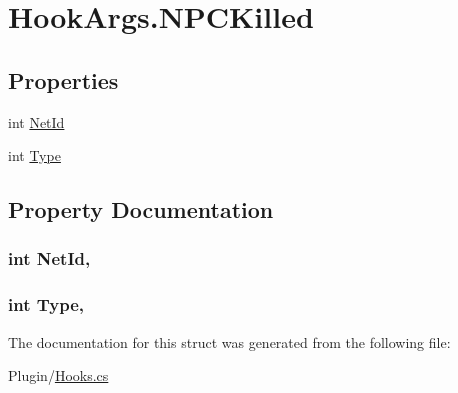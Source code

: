 \hypertarget{structOTA_1_1Plugin_1_1HookArgs_1_1NPCKilled}{}\section{Hook\+Args.\+N\+P\+C\+Killed}
\label{structOTA_1_1Plugin_1_1HookArgs_1_1NPCKilled}
\subsection*{Properties}
\begin{DoxyCompactItemize}
\item 
int \hyperlink{structOTA_1_1Plugin_1_1HookArgs_1_1NPCKilled_aede63d7c2e2a69e81c9019dd614e55fa}{Net\+Id}
\item 
int \hyperlink{structOTA_1_1Plugin_1_1HookArgs_1_1NPCKilled_ae011432eaca3858364b05a111f4011d3}{Type}
\end{DoxyCompactItemize}


\subsection{Property Documentation}
\hypertarget{structOTA_1_1Plugin_1_1HookArgs_1_1NPCKilled_aede63d7c2e2a69e81c9019dd614e55fa}{}
\subsubsection[{Net\+Id}]{\setlength{\rightskip}{0pt plus 5cm}int Net\+Id\hspace{0.3cm}{\ttfamily [get]}, {\ttfamily [set]}}\label{structOTA_1_1Plugin_1_1HookArgs_1_1NPCKilled_aede63d7c2e2a69e81c9019dd614e55fa}
\hypertarget{structOTA_1_1Plugin_1_1HookArgs_1_1NPCKilled_ae011432eaca3858364b05a111f4011d3}{}
\subsubsection[{Type}]{\setlength{\rightskip}{0pt plus 5cm}int Type\hspace{0.3cm}{\ttfamily [get]}, {\ttfamily [set]}}\label{structOTA_1_1Plugin_1_1HookArgs_1_1NPCKilled_ae011432eaca3858364b05a111f4011d3}


The documentation for this struct was generated from the following file\+:\begin{DoxyCompactItemize}
\item 
Plugin/\hyperlink{Hooks_8cs}{Hooks.\+cs}\end{DoxyCompactItemize}
